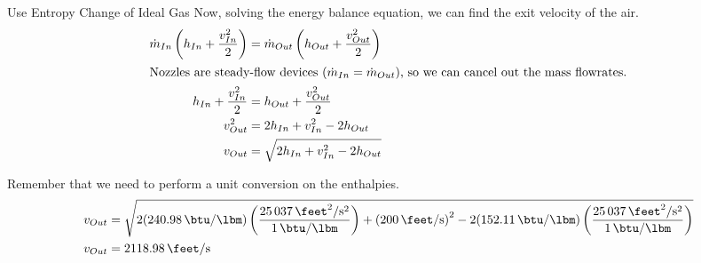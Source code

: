 \begin{example}{Use Entropy Change of Ideal Gas}
  Now, solving the energy balance equation, we can find the exit velocity of the air.
  \begin{align*}
    \dot{m}_{In} \left( h_{In} + \frac{v_{In}^{2}}{2} \right) &= \dot{m}_{Out} \left( h_{Out} + \frac{v_{Out}^{2}}{2} \right) \\
    \intertext{Nozzles are steady-flow devices ($\dot{m}_{In} = \dot{m}_{Out}$), so we can cancel out the mass flowrates.}
    h_{In} + \frac{v_{In}^{2}}{2} &= h_{Out} + \frac{v_{Out}^{2}}{2} \\
    v_{Out}^{2} &= 2h_{In} + v_{In}^{2} - 2h_{Out} \\
    v_{Out} &= \sqrt{2h_{In} + v_{In}^{2} - 2h_{Out}}
  \end{align*}

  Remember that we need to perform a unit conversion on the enthalpies.
  \begin{align*}
    \Velocity_{Out} &= \sqrt{2 (\SI{240.98}{\btu\per\lbm}) \left( \frac{\SI{25037}{\feet\squared\per\second\squared}}{\SI{1}{\btu\per\lbm}} \right) + {(\SI{200}{\feet\per\second})}^{2} - 2 (\SI{152.11}{\btu\per\lbm}) \left( \frac{\SI{25037}{\feet\squared\per\second\squared}}{\SI{1}{\btu\per\lbm}} \right)} \\
    \Velocity_{Out} &= \SI{2118.98}{\feet\per\second}
  \end{align*}
\end{example}

